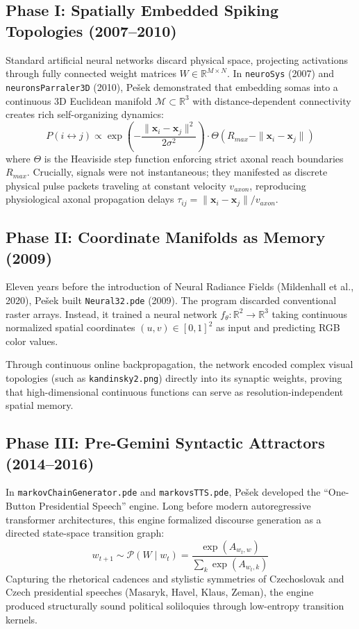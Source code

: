\documentclass[10pt,twocolumn,a4paper]{article}
\begin{document}
\subsection{Phase I: Spatially Embedded Spiking Topologies (2007--2010)}
Standard artificial neural networks discard physical space, projecting activations through fully connected weight matrices $W \in \mathbb{R}^{M \times N}$. In \texttt{neuroSys} (2007) and \texttt{neuronsParraler3D} (2010), Pe\v{s}ek demonstrated that embedding somas into a continuous 3D Euclidean manifold $\mathcal{M} \subset \mathbb{R}^3$ with distance-dependent connectivity creates rich self-organizing dynamics:
\begin{equation}
P(i \leftrightarrow j) \propto \exp\left(-\frac{\|\mathbf{x}_i - \mathbf{x}_j\|^2}{2\sigma^2}\right) \cdot \Theta(R_{max} - \|\mathbf{x}_i - \mathbf{x}_j\|)
\end{equation}
where $\Theta$ is the Heaviside step function enforcing strict axonal reach boundaries $R_{max}$. Crucially, signals were not instantaneous; they manifested as discrete physical pulse packets traveling at constant velocity $v_{axon}$, reproducing physiological axonal propagation delays $\tau_{ij} = \|\mathbf{x}_i - \mathbf{x}_j\| / v_{axon}$.

\subsection{Phase II: Coordinate Manifolds as Memory (2009)}
Eleven years before the introduction of Neural Radiance Fields (Mildenhall et al., 2020), Pe\v{s}ek built \texttt{Neural32.pde} (2009). The program discarded conventional raster arrays. Instead, it trained a neural network $f_\theta: \mathbb{R}^2 \to \mathbb{R}^3$ taking continuous normalized spatial coordinates $(u, v) \in [0, 1]^2$ as input and predicting RGB color values.

Through continuous online backpropagation, the network encoded complex visual topologies (such as \texttt{kandinsky2.png}) directly into its synaptic weights, proving that high-dimensional continuous functions can serve as resolution-independent spatial memory.

\subsection{Phase III: Pre-Gemini Syntactic Attractors (2014--2016)}
In \texttt{markovChainGenerator.pde} and \texttt{markovsTTS.pde}, Pe\v{s}ek developed the ``One-Button Presidential Speech'' engine. Long before modern autoregressive transformer architectures, this engine formalized discourse generation as a directed state-space transition graph:
\begin{equation}
w_{t+1} \sim \mathcal{P}(W \mid w_t) = \frac{\exp(A_{w_t, w})}{\sum_k \exp(A_{w_t, k})}
\end{equation}
Capturing the rhetorical cadences and stylistic symmetries of Czechoslovak and Czech presidential speeches (Masaryk, Havel, Klaus, Zeman), the engine produced structurally sound political soliloquies through low-entropy transition kernels.
\end{document}
